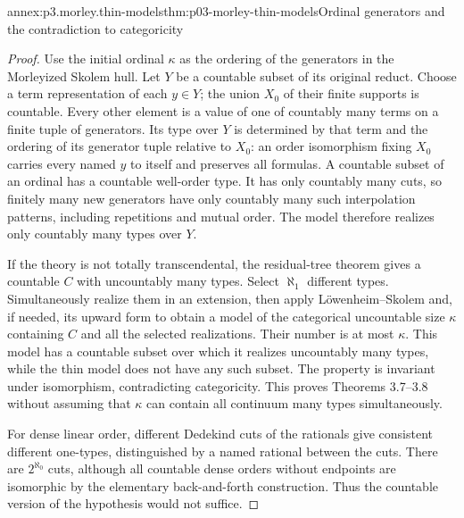\begin{annexitem}{annex:p3.morley.thin-models}{thm:p03-morley-thin-models}{Ordinal generators and the contradiction to categoricity}
\begin{proof}
Use the initial ordinal \(\kappa\) as the ordering
of the generators in the Morleyized Skolem hull.
Let \(Y\) be a countable subset of its original
reduct. Choose a term representation of each
\(y\in Y\); the union \(X_0\) of their finite
supports is countable. Every other element is
a value of one of countably many terms on a
finite tuple of generators. Its type over \(Y\)
is determined by that term and the ordering
of its generator tuple relative to \(X_0\):
an order isomorphism fixing \(X_0\) carries
every named \(y\) to itself and preserves all
formulas. A countable subset of an ordinal
has a countable well-order type. It has only
countably many cuts, so finitely many new
generators have only countably many such
interpolation patterns, including repetitions
and mutual order. The model therefore realizes
only countably many types over \(Y\).

If the theory is not totally transcendental,
the residual-tree theorem gives a countable
\(C\) with uncountably many types. Select
\(\aleph_1\) different types. Simultaneously
realize them in an extension, then apply
Löwenheim--Skolem and, if needed, its upward
form to obtain a model of the categorical
uncountable size \(\kappa\) containing
\(C\) and all the selected realizations.
Their number is at most \(\kappa\). This
model has a countable subset over which it
realizes uncountably many types, while the
thin model does not have any such subset.
The property is invariant under isomorphism,
contradicting categoricity. This proves
Theorems 3.7--3.8 without assuming that
\(\kappa\) can contain all continuum many
types simultaneously.

For dense linear order, different Dedekind
cuts of the rationals give consistent
different one-types, distinguished by a
named rational between the cuts. There are
\(2^{\aleph_0}\) cuts, although all countable
dense orders without endpoints are isomorphic
by the elementary back-and-forth construction.
Thus the countable version of the hypothesis
would not suffice.
\end{proof}
\end{annexitem}


